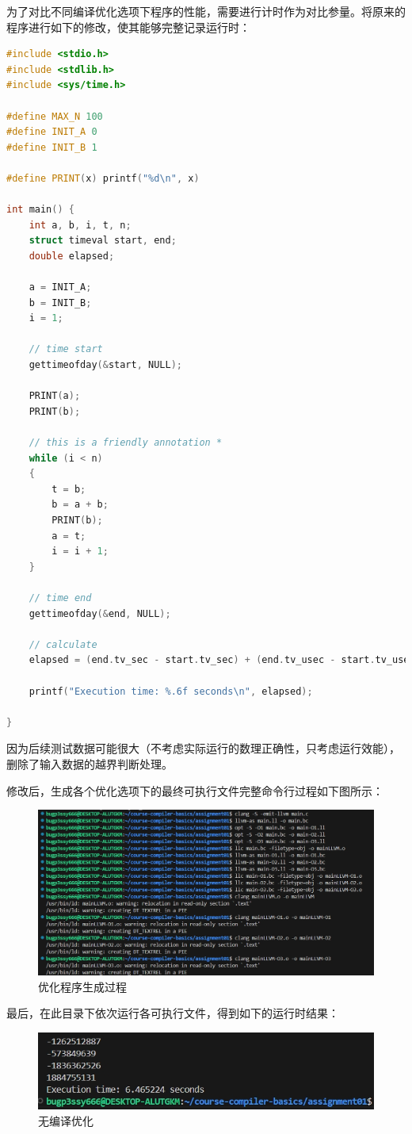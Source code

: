 \documentclass[UTF8,a4paper,10pt]{ctexart}
\begin{document}
\vspace{1em}

为了对比不同编译优化选项下程序的性能，需要进行计时作为对比参量。将原来的程序进行如下的修改，使其能够完整记录运行时：
\begin{lstlisting}[title=修改后的 main.c,frame=trbl,language={C++}]
#include <stdio.h>
#include <stdlib.h>
#include <sys/time.h>

#define MAX_N 100
#define INIT_A 0
#define INIT_B 1

#define PRINT(x) printf("%d\n", x)

int main() {
    int a, b, i, t, n;
    struct timeval start, end;
    double elapsed;

    a = INIT_A;
    b = INIT_B;
    i = 1;

    // time start
    gettimeofday(&start, NULL);

    PRINT(a);
    PRINT(b);

    // this is a friendly annotation *
    while (i < n)
    {
        t = b;
        b = a + b;
        PRINT(b);
        a = t;
        i = i + 1;
    }

    // time end
    gettimeofday(&end, NULL);

    // calculate
    elapsed = (end.tv_sec - start.tv_sec) + (end.tv_usec - start.tv_usec) / 1000000.0;

    printf("Execution time: %.6f seconds\n", elapsed);

}
\end{lstlisting}

因为后续测试数据可能很大（不考虑实际运行的数理正确性，只考虑运行效能），删除了输入数据的越界判断处理。

修改后，生成各个优化选项下的最终可执行文件完整命令行过程如下图所示：
\begin{figure} [H]
    \centering
    \includegraphics[width=0.75\linewidth]{ccl_0.jpg}
    \caption{优化程序生成过程}
    \label{fig:placeholder}
\end{figure}

最后，在此目录下依次运行各可执行文件，得到如下的运行时结果：
\begin{figure} [H]
    \centering
    \includegraphics[width=0.7\linewidth]{ccl_1.jpg}
    \caption{无编译优化}
    \label{fig:placeholder}
\end{figure}
\end{document}
